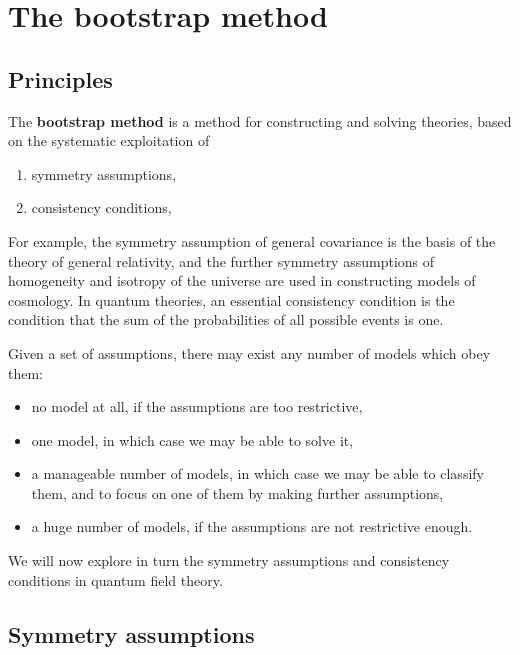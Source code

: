 \documentclass[12pt,a4paper,notitlepage]{report}
\numberwithin{equation}{section}
\newcommand{\term}[1]{\textbf{\boldmath #1}\index{#1}}
\theoremstyle{break}
\begin{document}
\section{The bootstrap method}

\subsection{Principles \label{secprin}}

The \term{bootstrap method} is a method for constructing and solving theories, based on the systematic exploitation of 
\begin{enumerate}
 \item symmetry assumptions,
 \item consistency conditions,
\end{enumerate}
For example, the symmetry assumption of general covariance is the basis of the theory of general relativity, and the further symmetry assumptions of homogeneity and isotropy of the universe are used in constructing models of cosmology.
In quantum theories, an essential consistency condition is the condition that the sum of the probabilities of all possible events is one. 

Given a set of assumptions, there may exist any number of models which obey them:
\begin{itemize}
 \item no model at all, if the assumptions are too restrictive,
\item one model, in which case we may be able to solve it,
\item a manageable number of models, in which case we may be able to classify them, and to focus on one of them by making further assumptions,
\item a huge number of models, if the assumptions are not restrictive enough.
\end{itemize}
We will now explore in turn the symmetry assumptions and consistency conditions in quantum field theory. 

\subsection{Symmetry assumptions \label{secsa}}
\end{document}
